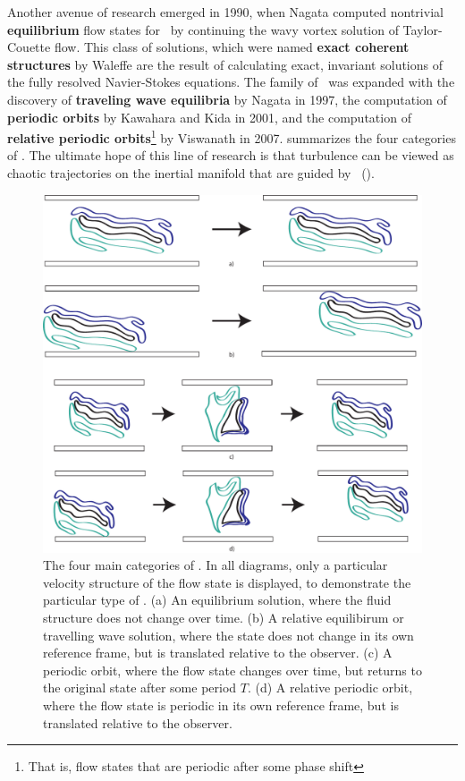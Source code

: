 Another avenue of research emerged in 1990, when Nagata computed nontrivial {\bf equilibrium} flow states for \pCf\ by continuing the wavy vortex solution of Taylor-Couette flow. This class of solutions, which were named {\bf exact coherent structures} by Waleffe are the result of calculating exact, invariant solutions of the fully resolved Navier-Stokes equations. The family of \ecs\ was expanded with the discovery of {\bf traveling wave equilibria} by Nagata in 1997, the computation of {\bf periodic orbits} by Kawahara and Kida in 2001, and the computation of {\bf relative periodic orbits}\footnote{That is, flow states that are periodic after some phase shift} by Viswanath in 2007.  summarizes the four categories of \ecs. The ultimate hope of this line of research is that turbulence can be viewed as chaotic trajectories on the inertial manifold that are guided by \ecs~(). \\
\begin{figure}[ht!]
\centerline{\includegraphics[scale=0.5]{Figs/ECSClassification}}
\caption{The four main categories of \ecs. In all diagrams, only a particular velocity structure of the flow state is displayed, to demonstrate the particular type of \ecs. (a) An {equilibrium} solution, where the fluid structure does not change over time. (b) A {relative equilibirum} or {travelling wave} solution, where the state does not change in its own reference frame, but is translated relative to the observer. (c) A {periodic orbit}, where the flow state changes over time, but returns to the original state after some period $T$. (d) A {relative periodic orbit}, where the flow state is periodic in its own reference frame, but is translated relative to the observer.}\label{fig:ECS}
\end{figure}


